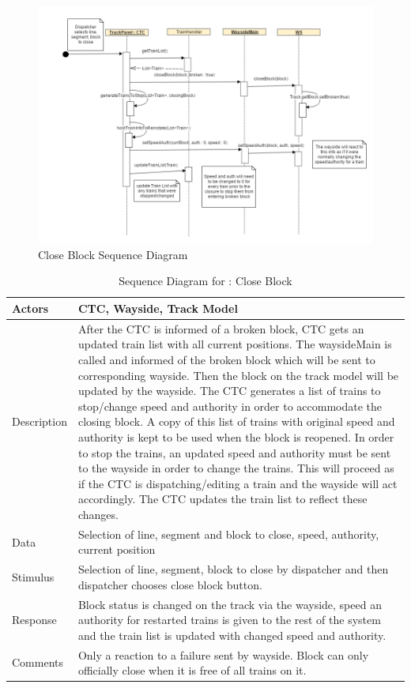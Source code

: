 \documentclass[]{article}
\begin{document}
\begin{figure}[H]
	\centering
	\includegraphics[width=\textwidth]{CTCcloseTrack.png}
	\caption{Close Block Sequence Diagram}
\end{figure}

    \begin{table}[H]
	\centering
	\caption{Sequence Diagram for : Close Block}
	\begin{tabular}{|l|l|}
		\hline
		Actors & \parbox[t]{10cm}{CTC, Wayside, Track Model} \\ \hline
		Description & \parbox[t]{10cm}{After the CTC is informed of a broken block, CTC gets an updated train list with all current positions. The waysideMain is called and informed of the broken block which will be sent to corresponding wayside. Then the block on the track model will be updated by the wayside. The CTC generates a list of trains to stop/change speed and authority in order to accommodate the closing block. A copy of this list of trains with original speed and authority is kept to be used when the block is reopened. In order to stop the trains, an updated speed and authority must be sent to the wayside in order to change the trains. This will proceed as if the CTC is dispatching/editing a train and the wayside will act accordingly. The CTC updates the train list to reflect these changes.} \\ \hline
		Data &  \parbox[t]{10cm}{Selection of line, segment and block to close, speed, authority, current position} \\ \hline
		Stimulus &  \parbox[t]{10cm}{Selection of line, segment, block to close by dispatcher and then dispatcher chooses close block button.} \\ \hline
		Response & \parbox[t]{10cm}{Block status is changed on the track via the wayside, speed an authority for restarted trains is given to the rest of the system and the train list is updated with changed speed and authority.}\\ \hline
		Comments & \parbox[t]{10cm}{Only a reaction to a failure sent by wayside. Block can only officially close when it is free of all trains on it.}  \\ \hline
	\end{tabular}
\end{table}
\end{document}
